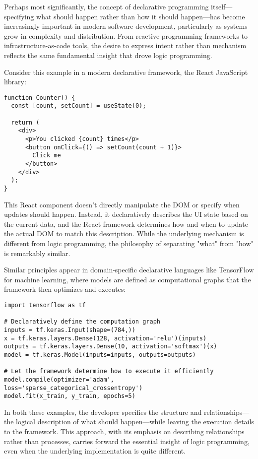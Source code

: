 \documentclass[11pt]{article}
\begin{document}
Perhaps most significantly, the concept of declarative programming itself—specifying what should happen rather than how it should happen—has become increasingly important in modern software development, particularly as systems grow in complexity and distribution. From reactive programming frameworks to infrastructure-as-code tools, the desire to express intent rather than mechanism reflects the same fundamental insight that drove logic programming.

Consider this example in a modern declarative framework, the React JavaScript library:

\begin{verbatim}
function Counter() {
  const [count, setCount] = useState(0);

  return (
    <div>
      <p>You clicked {count} times</p>
      <button onClick={() => setCount(count + 1)}>
        Click me
      </button>
    </div>
  );
}
\end{verbatim}

This React component doesn't directly manipulate the DOM or specify when updates should happen. Instead, it declaratively describes the UI state based on the current data, and the React framework determines how and when to update the actual DOM to match this description. While the underlying mechanism is different from logic programming, the philosophy of separating "what" from "how" is remarkably similar.

Similar principles appear in domain-specific declarative languages like TensorFlow for machine learning, where models are defined as computational graphs that the framework then optimizes and executes:

\begin{verbatim}
import tensorflow as tf

# Declaratively define the computation graph
inputs = tf.keras.Input(shape=(784,))
x = tf.keras.layers.Dense(128, activation='relu')(inputs)
outputs = tf.keras.layers.Dense(10, activation='softmax')(x)
model = tf.keras.Model(inputs=inputs, outputs=outputs)

# Let the framework determine how to execute it efficiently
model.compile(optimizer='adam', loss='sparse_categorical_crossentropy')
model.fit(x_train, y_train, epochs=5)
\end{verbatim}

In both these examples, the developer specifies the structure and relationships—the logical description of what should happen—while leaving the execution details to the framework. This approach, with its emphasis on describing relationships rather than processes, carries forward the essential insight of logic programming, even when the underlying implementation is quite different.
\end{document}
